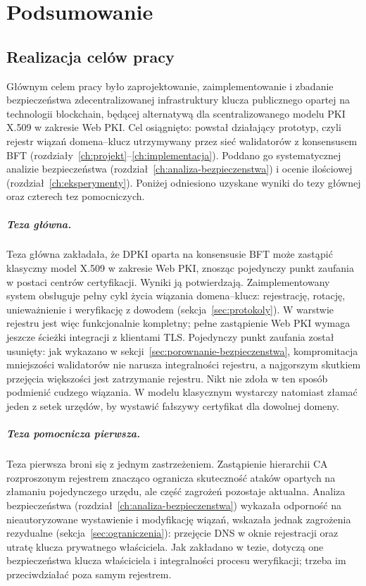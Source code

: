 \chapter{Podsumowanie}
\label{ch:podsumowanie}

\section{Realizacja celów pracy}
\label{sec:realizacja-celow}

Głównym celem pracy było zaprojektowanie, zaimplementowanie i zbadanie bezpieczeństwa zdecentralizowanej infrastruktury klucza publicznego opartej na technologii blockchain, będącej alternatywą dla scentralizowanego modelu PKI X.509 w zakresie Web PKI. Cel osiągnięto: powstał działający prototyp, czyli rejestr wiązań domena--klucz utrzymywany przez sieć walidatorów z konsensusem BFT (rozdziały~\ref{ch:projekt}--\ref{ch:implementacja}). Poddano go systematycznej analizie bezpieczeństwa (rozdział~\ref{ch:analiza-bezpieczenstwa}) i ocenie ilościowej (rozdział~\ref{ch:eksperymenty}). Poniżej odniesiono uzyskane wyniki do tezy głównej oraz czterech tez pomocniczych.

\paragraph{Teza główna.} Teza główna zakładała, że DPKI oparta na konsensusie BFT może zastąpić klasyczny model X.509 w zakresie Web PKI, znosząc pojedynczy punkt zaufania w postaci centrów certyfikacji. Wyniki ją potwierdzają. Zaimplementowany system obsługuje pełny cykl życia wiązania domena--klucz: rejestrację, rotację, unieważnienie i weryfikację z dowodem (sekcja~\ref{sec:protokoly}). W warstwie rejestru jest więc funkcjonalnie kompletny; pełne zastąpienie Web PKI wymaga jeszcze ścieżki integracji z klientami TLS. Pojedynczy punkt zaufania został usunięty: jak wykazano w sekcji~\ref{sec:porownanie-bezpieczenstwa}, kompromitacja mniejszości walidatorów nie narusza integralności rejestru, a najgorszym skutkiem przejęcia większości jest zatrzymanie rejestru. Nikt nie zdoła w ten sposób podmienić cudzego wiązania. W modelu klasycznym wystarczy natomiast złamać jeden z setek urzędów, by wystawić fałszywy certyfikat dla dowolnej domeny.

\paragraph{Teza pomocnicza pierwsza.} Teza pierwsza broni się z jednym zastrzeżeniem. Zastąpienie hierarchii CA rozproszonym rejestrem znacząco ogranicza skuteczność ataków opartych na złamaniu pojedynczego urzędu, ale część zagrożeń pozostaje aktualna. Analiza bezpieczeństwa (rozdział~\ref{ch:analiza-bezpieczenstwa}) wykazała odporność na nieautoryzowane wystawienie i modyfikację wiązań, wskazała jednak zagrożenia rezydualne (sekcja~\ref{sec:ograniczenia}): przejęcie DNS w oknie rejestracji oraz utratę klucza prywatnego właściciela. Jak zakładano w tezie, dotyczą one bezpieczeństwa klucza właściciela i integralności procesu weryfikacji; trzeba im przeciwdziałać poza samym rejestrem.

